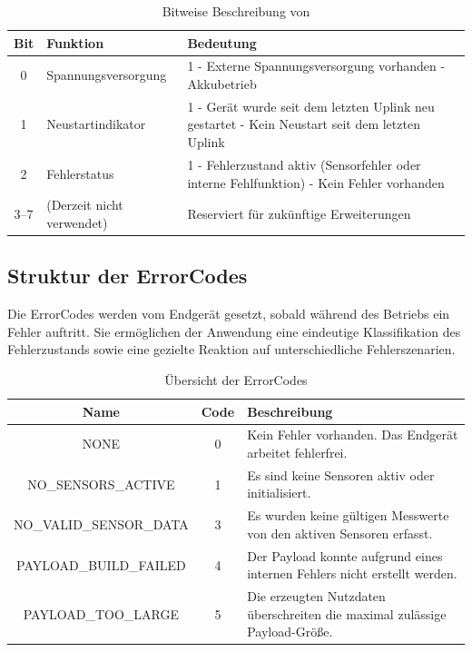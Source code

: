 \begin{table}[H]
	\caption{Bitweise Beschreibung von }
	\begin{tabularx}{\textwidth}{c|X|X}
		\hline
		\textbf{Bit} & \textbf{Funktion} & \textbf{Bedeutung} \\
		\hline
		0 & Spannungsversorgung 
		& 1 - Externe Spannungsversorgung vorhanden \newline
		0 - Akkubetrieb \\
		\hline
		1 & Neustartindikator 
		& 1 - Gerät wurde seit dem letzten Uplink neu gestartet \newline
		0 - Kein Neustart seit dem letzten Uplink \\
		\hline
		2 & Fehlerstatus 
		& 1 - Fehlerzustand aktiv (Sensorfehler oder interne Fehlfunktion) \newline
		0 - Kein Fehler vorhanden \\
		\hline
		3--7 & (Derzeit nicht verwendet) & Reserviert für zukünftige Erweiterungen \\
		\hline
	\end{tabularx}
\end{table}

\subsection{Struktur der ErrorCodes \label{SA:ErrorCodes}}
	Die ErrorCodes werden vom Endgerät gesetzt, sobald während des Betriebs ein Fehler auftritt. Sie ermöglichen der Anwendung eine eindeutige Klassifikation des Fehlerzustands sowie eine gezielte Reaktion auf unterschiedliche Fehlerszenarien.
	\begin{table}[H]
		\caption{Übersicht der ErrorCodes}
		\begin{tabularx}{\textwidth}{c|c|X}
			\hline
			\textbf{Name} & \textbf{Code} & \textbf{Beschreibung} \\
			\hline
			
			NONE & 0 &
			Kein Fehler vorhanden. Das Endgerät arbeitet fehlerfrei. \\
			\hline
			
			NO\_SENSORS\_ACTIVE & 1 &
			Es sind keine Sensoren aktiv oder initialisiert. \\
			\hline
			
			NO\_VALID\_SENSOR\_DATA & 3 &
			Es wurden keine gültigen Messwerte von den aktiven Sensoren erfasst. \\
			\hline
			
			PAYLOAD\_BUILD\_FAILED & 4 &
			Der Payload konnte aufgrund eines internen Fehlers nicht erstellt werden. \\
			\hline
			
			PAYLOAD\_TOO\_LARGE & 5 &
			Die erzeugten Nutzdaten überschreiten die maximal zulässige Payload-Grö{\ss}e. \\
			\hline
			
		\end{tabularx}
	\end{table}
	


